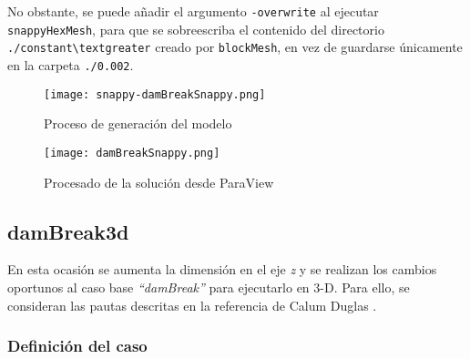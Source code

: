 No obstante, se puede añadir el argumento \texttt{-overwrite} al ejecutar
\texttt{snappyHexMesh}, para que se sobreescriba el contenido del
directorio \lstinline[style=bash]{./constant\textgreater} creado por
\texttt{blockMesh}, en vez de guardarse únicamente en la carpeta
\lstinline[style=bash]{./0.002}.

\begin{figure}[ht]
\centering
\texttt{[image: snappy-damBreakSnappy.png]}
\caption{Proceso de generación del modelo}
\label{fig:snappy-damBreakSnappy}
\end{figure}

\begin{figure}[hb]
  \centering
  \texttt{[image: damBreakSnappy.png]}
  \caption{Procesado de la solución desde ParaView}
  \label{fig:damBreakSnappy}
  \end{figure}

\subsection{damBreak3d}\label{header-n982}

En esta ocasión se aumenta la dimensión en el eje \emph{z} y se realizan
los cambios oportunos al caso base \emph{``damBreak''} para ejecutarlo en
3-D. Para ello, se consideran las pautas descritas en la referencia de Calum
Duglas \cite{calum}.

\subsubsection{Definición del caso}\label{header-n987}

